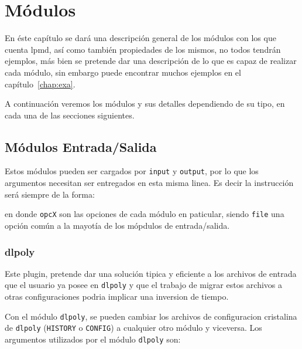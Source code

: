 \chapter{M\'odulos}
\label{chap:modulos}

En \'este cap\'itulo se dar\'a una descripci\'on general de los m\'odulos con los que cuenta lpmd, as\'i como tambi\'en propiedades de los mismos, no todos tendr\'an ejemplos, m\'as bien se pretende dar una descripci\'on de lo que es capaz de realizar cada m\'odulo, sin embargo puede encontrar muchos ejemplos en el cap\'itulo~\ref{chap:exa}.

A continuaci\'on veremos los m\'odulos y sus detalles dependiendo de su tipo, en cada una de las secciones siguientes.

\section{M\'odulos Entrada/Salida}
\label{chap:modulos:entradasalida}
Estos m\'odulos pueden ser cargados por \verb|input| y \verb|output|, por lo que los argumentos necesitan ser entregados en esta misma linea. Es decir la instrucci\'on ser\'a siempre de la forma:


en donde \verb|opcX| son las opciones de cada m\'odulo en paticular, siendo \verb|file| una opci\'on com\'un a la mayot\'ia de los m\'opdulos de entrada/salida.

\subsection{dlpoly}
Este plugin, pretende dar una soluci\'on tipica y eficiente a los archivos de entrada que el usuario ya posee en \verb|dlpoly| y que el trabajo de migrar estos archivos a otras configuraciones podria implicar una inversion de tiempo.

Con el m\'odulo \verb|dlpoly|, se pueden cambiar los archivos de configuracion cristalina de \verb|dlpoly| (\verb|HISTORY| o \verb|CONFIG|) a cualquier otro m\'odulo y viceversa. Los argumentos utilizados por el m\'odulo \verb|dlpoly| son:


